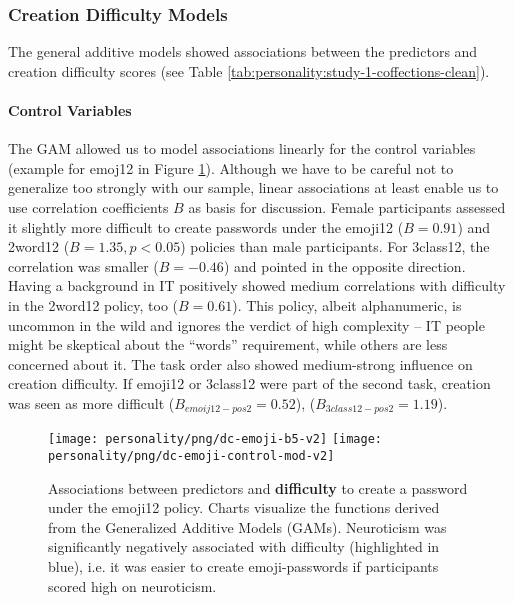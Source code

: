 \subsubsection{Creation Difficulty Models}
The general additive models showed associations between the predictors and creation difficulty scores (see Table \ref{tab:personality:study-1-coffections-clean}). 

\paragraph{Control Variables} 
The GAM allowed us to model associations linearly for the control variables (example for emoj12 in Figure \ref{fig:personality:dc-emoji-b5}). Although we have to be careful not to generalize too strongly with our sample, linear associations at least enable us to use correlation coefficients $B$ as basis for discussion.
Female participants assessed it slightly more difficult to create passwords under the emoji12 ($B=0.91$) and 2word12 ($B=1.35, p<0.05$) policies than male participants. For 3class12, the correlation was smaller ($B=-0.46$) and pointed in the opposite direction. 
Having a background in IT positively showed medium correlations with difficulty in the 2word12 policy, too ($B=0.61$). This policy, albeit alphanumeric, is uncommon in the wild and ignores the verdict of high complexity -- IT people might be skeptical about the ``words'' requirement, while others are less concerned about it.
The task order also showed medium-strong influence on creation difficulty. If emoji12 or 3class12 were part of the second task, creation was seen as more difficult ($B_{emoij12-pos2}=0.52$),  ($B_{3class12-pos2}=1.19$). 


\begin{figure}
\texttt{[image: personality/png/dc-emoji-b5-v2]}
\texttt{[image: personality/png/dc-emoji-control-mod-v2]}
\caption{\label{fig:personality:dc-emoji-b5}Associations between predictors and \textbf{difficulty} to create a password under the emoji12 policy. Charts visualize the functions derived from the Generalized Additive Models (GAMs). Neuroticism was significantly negatively associated with difficulty (highlighted in blue), i.e. it was easier to create emoji-passwords if participants scored high on neuroticism.}
\end{figure}

